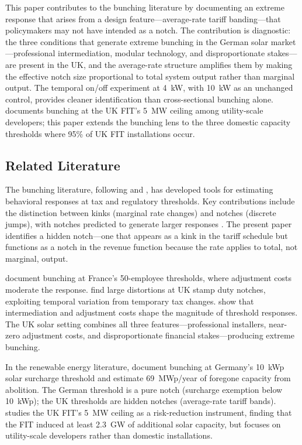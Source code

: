\documentclass[12pt]{article}
\begin{document}
This paper contributes to the bunching literature \citep{saez2010taxpayers, kleven2013using} by documenting an extreme response that arises from a design feature---average-rate tariff banding---that policymakers may not have intended as a notch. The contribution is diagnostic: the three conditions that generate extreme bunching in the German solar market \citep{klimsa2024tax}---professional intermediation, modular technology, and disproportionate stakes---are present in the UK, and the average-rate structure amplifies them by making the effective notch size proportional to total system output rather than marginal output. The temporal on/off experiment at 4~kW, with 10~kW as an unchanged control, provides cleaner identification than cross-sectional bunching alone. \citet{srivastav2024breakthrough} documents bunching at the UK FIT's 5~MW ceiling among utility-scale developers; this paper extends the bunching lens to the three domestic capacity thresholds where 95\% of UK FIT installations occur.

\subsection*{Related Literature}

The bunching literature, following \citet{saez2010taxpayers} and \citet{kleven2013using}, has developed tools for estimating behavioral responses at tax and regulatory thresholds. Key contributions include the distinction between kinks (marginal rate changes) and notches (discrete jumps), with notches predicted to generate larger responses \citep{kleven2016bunching}. The present paper identifies a hidden notch---one that appears as a kink in the tariff schedule but functions as a notch in the revenue function because the rate applies to total, not marginal, output.

\citet{garicano2016firm} document bunching at France's 50-employee thresholds, where adjustment costs moderate the response. \citet{best2018housing} find large distortions at UK stamp duty notches, exploiting temporal variation from temporary tax changes. \citet{chetty2011adjustment} show that intermediation and adjustment costs shape the magnitude of threshold responses. The UK solar setting combines all three features---professional installers, near-zero adjustment costs, and disproportionate financial stakes---producing extreme bunching.

In the renewable energy literature, \citet{klimsa2024tax} document bunching at Germany's 10~kWp solar surcharge threshold and estimate 69~MWp/year of foregone capacity from abolition. The German threshold is a pure notch (surcharge exemption below 10~kWp); the UK thresholds are hidden notches (average-rate tariff bands). \citet{srivastav2024breakthrough} studies the UK FIT's 5~MW ceiling as a risk-reduction instrument, finding that the FIT induced at least 2.3~GW of additional solar capacity, but focuses on utility-scale developers rather than domestic installations.
\end{document}
